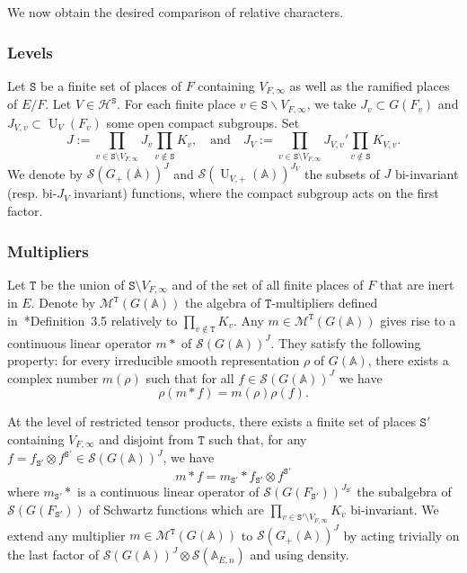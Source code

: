 \documentclass[letterpaper,11pt]{amsart}
\newcommand{\bA}{\mathbb{A}}
\newcommand{\cH}{\mathcal{H}}
\newcommand{\cM}{\mathcal{M}}
\newcommand{\cS}{\mathcal{S}}
\newcommand{\tS}{\mathtt{S}}
\newcommand{\tT}{\mathtt{T}}
\newcommand{\<}{\negthickspace}
\DeclareMathOperator{\U}{U}
\theoremstyle{definition}
\theoremstyle{plain}
\theoremstyle{remark}
\numberwithin{equation}{section}
\begin{document}
We now obtain the desired comparison of relative characters.

\subsubsection{Levels}
Let $\tS$ be a finite set of places of $F$ containing $V_{F,\infty}$ as well as the ramified places of $E/F$. Let $V \in \cH^\tS$. For each finite place $v \in \tS \backslash V_{F,\infty}$, we take $J_v \subset G(F_v)$ and $J_{V,v} \subset \U_{V}(F_v)$ some open compact subgroups. Set
    \begin{equation*}
        J:= \prod_{v \in \tS \setminus V_{F,\infty}} J_v \prod_{v \notin \tS} K_v,  \quad \text{and} \quad J_{V}:= \prod_{v \in \tS \setminus V_{F,\infty}} J_{V,v}' \prod_{v \notin \tS} K_{V,v}.
    \end{equation*}
We denote by $\cS(G_+(\bA))^J$ and
$\cS(\U_{V,+}(\bA))^{J_V}$ the subsets of $J$ bi-invariant (resp. bi-$J_{V}$ invariant) functions, where the compact subgroup acts on the first factor. 

\subsubsection{Multipliers}

Let $\tT$ be the union of $\tS \setminus V_{F,\infty}$ and of the set of all finite places of $F$ that are inert in $E$. Denote by $\cM^{\tT}(G(\bA))$ the algebra of $\tT$-multipliers defined in~\cite{BPLZZ}*{Definition~3.5} relatively to $\prod_{v \not \in \tT} K_v$. Any $m \in \cM^{\tT}(G(\bA))$ gives rise to a continuous linear operator $m*$ of $\cS(G(\bA))^J$. They satisfy the following property: for every irreducible smooth representation $\rho$ of $G(\bA)$, there exists a complex number $m(\rho)$ such that for all $f \in \cS(G(\bA))^J$ we have
\begin{equation}
\label{eq:mult_fundamental}
    \rho(m*f)=m(\rho)\rho(f).
\end{equation}

At the level of restricted tensor products, there exists a finite set of places $\tS'$ containing $V_{F,\infty}$ and disjoint from $\tT$ such that, for any $f = f_{\tS'} \otimes f^{\tS'} \in \cS(G(\bA))^J$, we have
\begin{equation}
\label{eq:multiplier_finite_place}
    m*f= m_{\tS'}*f_{\tS'} \otimes f^{\tS'}
\end{equation}
where $m_{\tS'}*$ is a continuous linear operator of
$\cS(G(F_{\tS'}))^{J_{\tS'}}$ the subalgebra of $\cS(G(F_{\tS'}))$ of Schwartz
functions which are $\prod_{v \in \tS' \setminus V_{F,\infty}} K_v$ bi-invariant. We extend any multiplier $m \in \cM^{\tT}(G(\bA))$ to $\cS(G_+(\bA))^J$ by acting trivially on the last factor of $\cS(G(\bA))^J \otimes \cS(\bA_{E,n})$ and using density.
\end{document}
